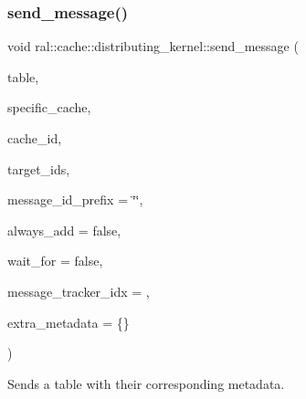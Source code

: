 \subsubsection{\texorpdfstring{send\+\_\+message()}{send\_message()}}
{\footnotesize\ttfamily void ral\+::cache\+::distributing\+\_\+kernel\+::send\+\_\+message (\begin{DoxyParamCaption}\item[{std\+::unique\+\_\+ptr$<$ \hyperlink{classral_1_1frame_1_1BlazingTable}{ral\+::frame\+::\+Blazing\+Table} $>$}]{table,  }\item[{bool}]{specific\+\_\+cache,  }\item[{std\+::string}]{cache\+\_\+id,  }\item[{std\+::vector$<$ std\+::string $>$}]{target\+\_\+ids,  }\item[{std\+::string}]{message\+\_\+id\+\_\+prefix = {\ttfamily \char`\"{}\char`\"{}},  }\item[{bool}]{always\+\_\+add = {\ttfamily false},  }\item[{bool}]{wait\+\_\+for = {\ttfamily false},  }\item[{std\+::size\+\_\+t}]{message\+\_\+tracker\+\_\+idx = {},  }\item[{\hyperlink{classral_1_1cache_1_1MetadataDictionary}{ral\+::cache\+::\+Metadata\+Dictionary}}]{extra\+\_\+metadata = {\ttfamily \{\}} }\end{DoxyParamCaption})}



Sends a table with their corresponding metadata. 


